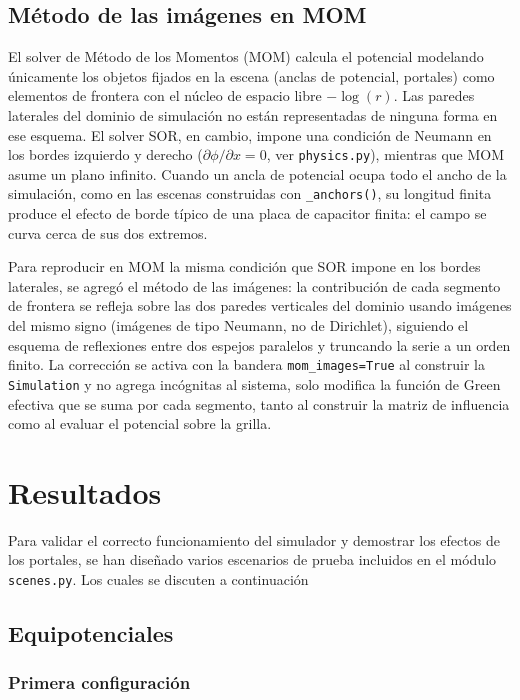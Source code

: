 \documentclass[12pt, twocolumn]{article}
\begin{document}
\subsection{Método de las imágenes en MOM}

El solver de Método de los Momentos (MOM) calcula el potencial modelando únicamente los objetos fijados en la escena (anclas de potencial, portales) como elementos de frontera con el núcleo de espacio libre $-\log(r)$. Las paredes laterales del dominio de simulación no están representadas de ninguna forma en ese esquema. El solver SOR, en cambio, impone una condición de Neumann en los bordes izquierdo y derecho ($\partial \phi / \partial x = 0$, ver \texttt{physics.py}), mientras que MOM asume un plano infinito. Cuando un ancla de potencial ocupa todo el ancho de la simulación, como en las escenas construidas con \texttt{\_anchors()}, su longitud finita produce el efecto de borde típico de una placa de capacitor finita: el campo se curva cerca de sus dos extremos.

Para reproducir en MOM la misma condición que SOR impone en los bordes laterales, se agregó el método de las imágenes: la contribución de cada segmento de frontera se refleja sobre las dos paredes verticales del dominio usando imágenes del mismo signo (imágenes de tipo Neumann, no de Dirichlet), siguiendo el esquema de reflexiones entre dos espejos paralelos y truncando la serie a un orden finito. La corrección se activa con la bandera \texttt{mom\_images=True} al construir la \texttt{Simulation} y no agrega incógnitas al sistema, solo modifica la función de Green efectiva que se suma por cada segmento, tanto al construir la matriz de influencia como al evaluar el potencial sobre la grilla.

\section{Resultados}\label{Result}

Para validar el correcto funcionamiento del simulador y demostrar los efectos de los portales, se han diseñado varios escenarios de prueba incluidos en el módulo \texttt{scenes.py}. Los cuales se discuten a continuación

\subsection{Equipotenciales}

\subsubsection{Primera configuración}
\end{document}
